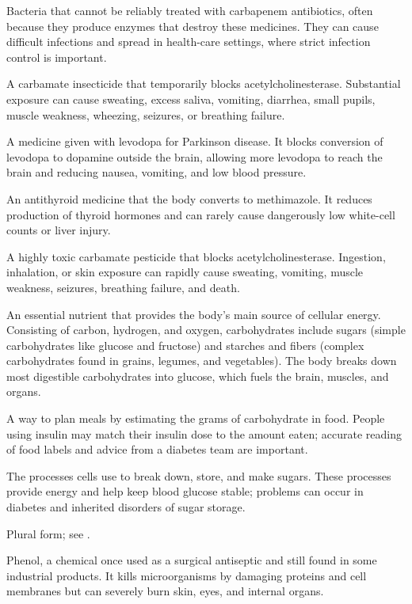  Bacteria that cannot be reliably treated with carbapenem antibiotics, often because they produce enzymes that destroy these medicines. They can cause difficult infections and spread in health-care settings, where strict infection control is important.

 A carbamate insecticide that temporarily blocks acetylcholinesterase. Substantial exposure can cause sweating, excess saliva, vomiting, diarrhea, small pupils, muscle weakness, wheezing, seizures, or breathing failure.

 A medicine given with levodopa for Parkinson disease. It blocks conversion of levodopa to dopamine outside the brain, allowing more levodopa to reach the brain and reducing nausea, vomiting, and low blood pressure.

 An antithyroid medicine that the body converts to methimazole. It reduces production of thyroid hormones and can rarely cause dangerously low white-cell counts or liver injury.

 A highly toxic carbamate pesticide that blocks acetylcholinesterase. Ingestion, inhalation, or skin exposure can rapidly cause sweating, vomiting, muscle weakness, seizures, breathing failure, and death.

 An essential nutrient that provides the body's main source of cellular energy. Consisting of carbon, hydrogen, and oxygen, carbohydrates include sugars (simple carbohydrates like glucose and fructose) and starches and fibers (complex carbohydrates found in grains, legumes, and vegetables). The body breaks down most digestible carbohydrates into glucose, which fuels the brain, muscles, and organs.

 A way to plan meals by estimating the grams of carbohydrate in food. People using insulin may match their insulin dose to the amount eaten; accurate reading of food labels and advice from a diabetes team are important.

 The processes cells use to break down, store, and make sugars. These processes provide energy and help keep blood glucose stable; problems can occur in diabetes and inherited disorders of sugar storage.

 Plural form; see .

 Phenol, a chemical once used as a surgical antiseptic and still found in some industrial products. It kills microorganisms by damaging proteins and cell membranes but can severely burn skin, eyes, and internal organs.

